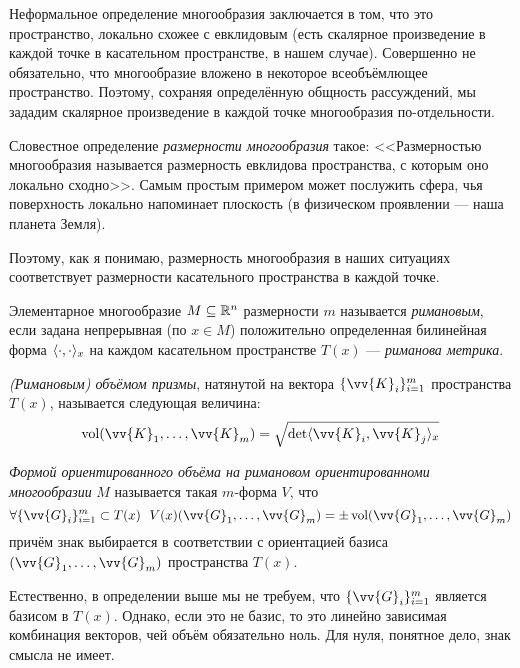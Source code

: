 \begin{anote}
	Неформальное определение многообразия заключается в том, что это пространство, локально схожее с евклидовым (есть скалярное произведение в каждой точке в касательном пространстве, в нашем случае). Совершенно не обязательно, что многообразие вложено в некоторое всеобъёмлющее пространство. Поэтому, сохраняя определённую общность рассуждений, мы зададим скалярное произведение в каждой точке многообразия по-отдельности.
	
	Словестное определение \textit{размерности многообразия} такое: <<Размерностью многообразия называется размерность евклидова пространства, с которым оно локально сходно>>. Самым простым примером может послужить сфера, чья поверхность локально напоминает плоскость (в физическом проявлении --- наша планета Земля).
	
	Поэтому, как я понимаю, размерность многообразия в наших ситуациях соответствует размерности касательного пространства в каждой точке.
\end{anote}

\begin{definition}
	Элементарное многообразие $M \subseteq \mathbb{R}^n$ размерности $m$ называется \textit{римановым}, если задана непрерывная (по $x \in M$) положительно определенная билинейная форма $\langle\cdot, \cdot\rangle_x$ на каждом касательном пространстве $T(x)$ --- \textit{риманова метрика}.
\end{definition}

\begin{definition}
	\textit{(Римановым) объёмом призмы}, натянутой на вектора $\{\vv{K}_i\}_{i = 1}^m$ пространства $T(x)$, называется следующая величина:
	\[
		\vol(\vv{K}_1, \ldots, \vv{K}_m) = \sqrt{\det\ntbr{\vv{K}_i, \vv{K}_j}_x}
	\]
\end{definition}

\begin{definition}
	\textit{Формой ориентированного объёма на римановом ориентированноми многообразии} $M$ называется такая $m$-форма $V$, что
	\[
		\forall \{\vv{G}_i\}_{i = 1}^m \subset T(x)\ \ V(x)(\vv{G}_1, \ldots, \vv{G}_m) = \pm \vol(\vv{G}_1, \ldots, \vv{G}_m)
	\]
	причём знак выбирается в соответствии с ориентацией базиса $(\vv{G}_1, \ldots, \vv{G}_m)$ пространства $T(x)$.
\end{definition}

\begin{anote}
	Естественно, в определении выше мы не требуем, что $\{\vv{G}_i\}_{i = 1}^m$ является базисом в $T(x)$. Однако, если это не базис, то это линейно зависимая комбинация векторов, чей объём обязательно ноль. Для нуля, понятное дело, знак смысла не имеет.
\end{anote}


